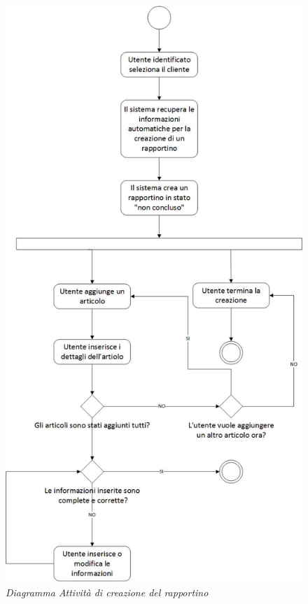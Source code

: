 \begin{figure}[ht]
	\centering
	\includegraphics[scale=0.52]{immagini/analisi/003_creazione_rapportino.jpg}
	\caption{\textit{Diagramma Attività di creazione del rapportino}}
\end{figure}\FloatBarrier



